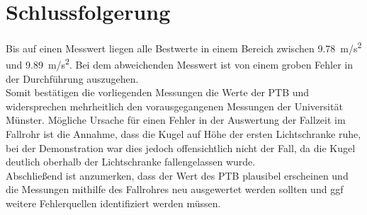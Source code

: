 \section{Schlussfolgerung}
Bis auf einen Messwert liegen alle Bestwerte in einem Bereich zwischen \SI{9,78}{m/s^2} und \SI{9,89}{m/s^2}. Bei dem abweichenden Messwert ist von einem groben Fehler in der Durchführung auszugehen.\\
Somit bestätigen die vorliegenden Messungen die Werte der PTB und widersprechen mehrheitlich den vorausgegangenen Messungen der Universität Münster. Mögliche Ursache für einen Fehler in der Auswertung der Fallzeit im Fallrohr ist die Annahme, dass die Kugel auf Höhe der ersten Lichtschranke ruhe, bei der Demonstration war dies jedoch offensichtlich nicht der Fall, da die Kugel deutlich oberhalb der Lichtschranke fallengelassen wurde.\\
Abschließend ist anzumerken, dass der Wert des PTB plausibel erscheinen und die Messungen mithilfe des Fallrohres neu ausgewertet werden sollten und ggf weitere Fehlerquellen identifiziert werden müssen.